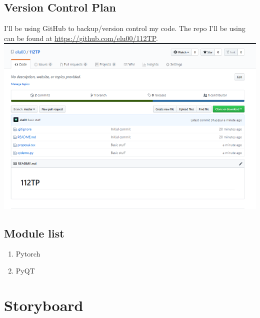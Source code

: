 \documentclass[12pt]{article}
\begin{document}
\subsection{Version Control Plan}
    I'll be using GitHub to backup/version control my code. 
    The repo I'll be using can be found at \href{https://github.com/elu00/112TP}{https://github.com/elu00/112TP}. \\
    \includegraphics[scale=0.8]{screenshot.png}
\subsection{Module list}
\begin{enumerate}
	\item Pytorch
	\item PyQT
\end{enumerate}
\section{Storyboard}
\end{document}
